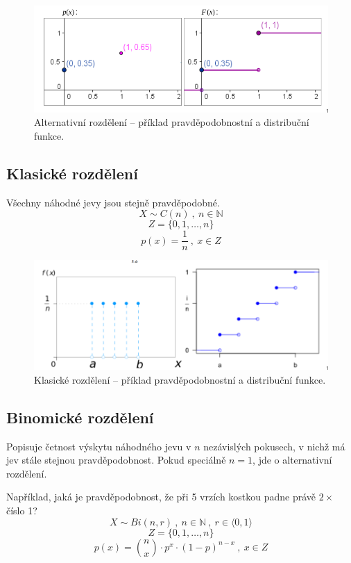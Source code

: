 \begin{figure}[H]
    \centering
    \includegraphics[width=1\linewidth]{dnp_alternativni.png}
    \caption{Alternativní rozdělení -- příklad pravděpodobnostní a distribuční funkce.}
\end{figure}

\subsection{Klasické rozdělení}

\begin{compactitem}
    \item Všechny náhodné jevy jsou stejně pravděpodobné.
    $$ X \sim C(n) ~,~ n \in \mathbb{N}$$
    $$ Z = \{ 0, 1, \ldots, n \}$$
    $$ p(x) = \frac{1}{n} ~,~ x \in Z $$
\end{compactitem}

\begin{figure}[H]
    \centering
    \includegraphics[width=1\linewidth]{dnp_klasicke.png}
    \caption{Klasické rozdělení -- příklad pravděpodobnostní a distribuční funkce.}
\end{figure}

\subsection{Binomické rozdělení}

\begin{compactitem}
    \item Popisuje četnost výskytu náhodného jevu v $n$ nezávislých pokusech, v nichž má jev stále stejnou pravděpodobnost. Pokud speciálně $n=1$, jde o alternativní rozdělení.
    \item Například, jaká je pravděpodobnost, že při 5 vrzích kostkou padne právě $2 \times$ číslo 1?
    $$ X \sim Bi(n, r) ~,~ n \in \mathbb{N} ~,~ r \in \langle 0, 1 \rangle $$
    $$ Z = \{ 0, 1, \ldots, n \}$$
    $$ p(x) = {n \choose x} \cdot p^x \cdot (1-p)^{n-x} ~,~ x \in Z $$
\end{compactitem}

